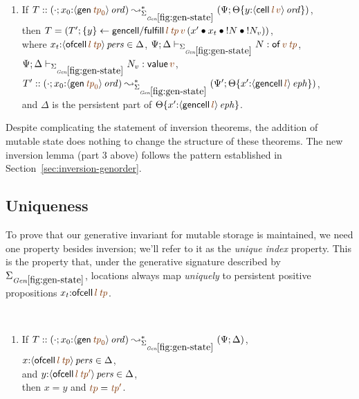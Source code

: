 \begin{lemma}
\begin{enumerate}
\medskip
\item If $T :: (\cdot; x_0{:}\istrue{\susp{{\sf gen}\,\lf{{\it tp}_0}}})
         \leadsto^*_{\siggenstate} 
         (\Psi; \tackon{\Theta}
            {y{:}\istrue{\susp{{\sf cell}\,\lf{{\it l}}\,\lf{v}}}})$,
\\ then $T = (T'; \trstep{y}{{\sf gencell/fulfill}\,\lf{l}\,\lf{\it tp}\,\lf{v}\,(\tfuser{x'}{\tfuser{x_t}{\tfuser{\tbangr{N}}{\tbangr{N_v}}}})})$,
\\ where $x_t{:}\ispers{\susp{{\sf ofcell}\,\lf{l}\,\lf{\it tp}}} \in \Delta$,
   $\Psi; \Delta \vdash_{\siggenstate} N : {\sf of}\,\lf{v}\,\lf{\it tp}$,
   $\Psi; \Delta \vdash_{\siggenstate} N_v : {\sf value}\,\lf{v}$,
\\ $T' :: (\cdot; x_0{:}\istrue{\susp{{\sf gen}\,\lf{{\it tp}_0}}})
       \leadsto^*_{\siggenstate}
       (\Psi'; \tackon{\Theta}
          {x'{:}\iseph{\susp{{\sf gencell}\,\lf{l}}}})$,
\\ and $\Delta$ is the persistent part of 
   $\tackon{\Theta}
          {x'{:}\iseph{\susp{{\sf gencell}\,\lf{l}}}}$.
\end{enumerate}
\end{lemma}
\bigskip

Despite complicating the statement of inversion theorems, the addition
of mutable state does nothing to change the structure 
of these theorems.
The new inversion lemma (part 3 above) follows the
pattern established in Section~\ref{sec:inversion-genorder}.

\subsection{Uniqueness}

To prove that our generative invariant for mutable storage is
maintained, we need one property besides inversion; we'll refer to it
as the {\it unique index} property. This is the property that, under
the generative signature described by $\siggenstate$, locations always
map {\it uniquely} to persistent positive propositions $x_t{:}{\sf
  ofcell}\,\lf{l}\,\lf{\it tp}$.

\bigskip
\begin{lemma}~
\begin{enumerate}
\item
If $T :: (\cdot; x_0{:}\istrue{\susp{{\sf gen}\,\lf{{\it tp}_0}}})
         \leadsto^*_{\siggenstate}
         (\Psi; \Delta)$,
\\ ${x}{:}\ispers{\susp{{\sf ofcell}\,\lf{l}\,\lf{\it tp}}} \in \Delta$, 
\\ and 
${y}{:}\ispers{\susp{{\sf ofcell}\,\lf{l}\,\lf{{\it tp}'}}} \in \Delta$, 
\\ then $x = y$ and $\lf{tp} = \lf{{\it tp}'}$.
\end{enumerate}
\end{lemma}

